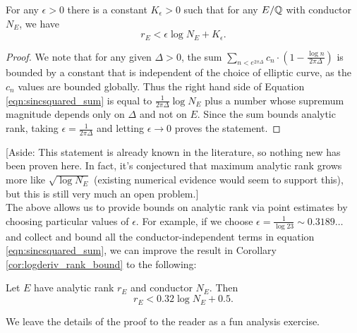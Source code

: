 \begin{corollary}[GRH]\label{cor:rank_slower_than_log_N}
For any $\epsilon >0$ there is a constant $K_{\epsilon}>0$ such that for any $E/\mathbb{Q}$ with conductor $N_E$, we have
\begin{equation}
r_E < \epsilon \log N_E + K_{\epsilon}.
\end{equation}
\end{corollary}
\begin{proof}
We note that for any given $\Delta>0$, the sum $ \sum_{n<e^{2\pi \Delta}} c_n \cdot \left(1-\frac{\log n}{2\pi \Delta}\right)$ is bounded by a constant that is independent of the choice of elliptic curve, as the $c_n$ values are bounded globally. Thus the right hand side of Equation \ref{eqn:sincsquared_sum} is equal to $\frac{1}{2\pi \Delta}\log N_E$ plus a number whose supremum magnitude depends only on $\Delta$ and not on $E$. Since the sum bounds analytic rank, taking $\epsilon = \frac{1}{2\pi \Delta}$ and letting $\epsilon \to 0$ proves the statement.
\end{proof}

[Aside: This statement is already known in the literature, so nothing new has been proven here. In fact, it's conjectured that maximum analytic rank grows more like $\sqrt{\log N_E}$ (existing numerical evidence would seem to support this), but this is still very much an open problem.] \\

The above allows us to provide bounds on analytic rank via point estimates by choosing particular values of $\epsilon$. For example, if we choose $\epsilon = \frac{1}{\log 23} \sim 0.3189\ldots$ and collect and bound all the conductor-independent terms in equation \ref{eqn:sincsquared_sum}, we can improve the result in Corollary \ref{cor:logderiv_rank_bound} to the following:
\begin{corollary}[GRH]\label{cor:better_an_bound}
Let $E$ have analytic rank $r_E$ and conductor $N_E$. Then
\begin{equation}
r_E < 0.32 \log N_E + 0.5.
\end{equation}
\end{corollary}
We leave the details of the proof to the reader as a fun analysis exercise.\\

